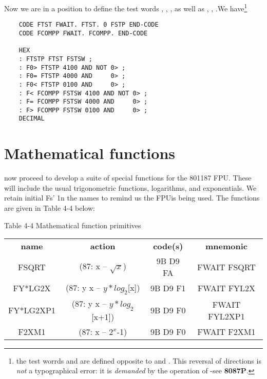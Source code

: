 Now we are in a position to define the test words , ,
, as well as , ,  .We have\footnote{\Note the test worrds  and  are defined opposite to  and . This reversal of directions is \textit{not} a typographical error: it is \textit{demanded} by the operation of  -see \textbf{8087P}.}

\begin{lstlisting}
    CODE FTST FWAIT. FTST. 0 FSTP END-CODE
    CODE FCOMPP FWAIT. FCOMPP. END-CODE

    HEX
    : FTSTP FTST FSTSW ;
    : F0> FTSTP 4100 AND NOT 0> ;
    : F0= FTSTP 4000 AND     0> ;
    : F0< FTSTP 0100 AND     0> ;
    : F< FCOMPP FSTSW 4100 AND NOT 0> ;
    : F= FCOMPP FSTSW 4000 AND     0> ;
    : F> FCOMPP FSTSW 0100 AND     0> ;
    DECIMAL
\end{lstlisting}

\section{Mathematical functions}

 now proceed to develop a suite of special functions for the 801187 FPU. These will include the usual trigonometric functions, logarithms, and exponentials. We retain initial Fs' 1n the names to remind us the FPUis being used. The functions are given in Table 4-4 below:

Table 4-4 Mathematical function primitives

\begin{center}
    \begin{tabular}{|c c c c|}
        \hline
        \textbf{name}   &   \textbf{action}               & \textbf{code(s)}  & \textbf{mnemonic} \\
        FSQRT           &   (87:   x -- $\sqrt{x}$)       & 9B D9 FA          & FWAIT FSQRT       \\
        FY*LG2X         &   (87: y x -- $y*log_{2}$[x])   & 9B D9 F1          & FWAIT FYL2X       \\
        FY*LG2XP1       &   (87: y x -- $y*log_{2}$[x+1]) & 9B D9 F0          & FWAIT FYL2XP1     \\
        F2XM1           &   (87:   x -- $2^{x}$-1)        & 9B D9 F0          & FWAIT F2XM1       \\
        \hline
    \end{tabular}
\end{center}

